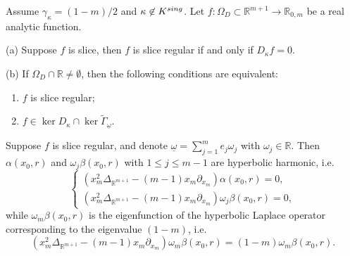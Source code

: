 \documentclass[10pt,a4paper]{amsart}
\begin{document}
\begin{theorem}  \label{sm1}  Assume $\gamma_{\kappa}=(1-m)/2$ and $\kappa \not\in K^{{\rm sing}}$. Let $f: \Omega_{D}\subset \mathbb{R}^{m+1}\to\mathbb{R}_{0, m}$ be a real analytic function.

{\rm (a)}  Suppose $f$ is slice, then $f$ is slice regular if and only if  $D_\kappa f=0$.

{\rm (b)} If  $\Omega_D\cap\mathbb{R}\neq\emptyset$,
then the following conditions are equivalent:
    \begin{enumerate}
        \item  $f$ is slice regular;
        \item  $f\in\ker D_\kappa \cap \ker \widetilde{\Gamma}_{\underline\omega}$.
    \end{enumerate}
\end{theorem}

\begin{theorem}
 \label{sld1} Suppose $f$ is  slice regular, and denote $\underline{\omega}=\sum_{j=1}^{m}e_{j}\omega_{j}$ with $\omega_{j}\in \mathbb{R}$. Then  $\alpha(x_{0}, r) $ and   $\omega_{j} \beta(x_{0}, r)$ with $1\le j\le m-1$ are hyperbolic harmonic, i.e.
 \begin{equation} \label{a1}
    \left\{
  \begin{array}{ll}
    \displaystyle\left(x_{m}^{2}\Delta_{\mathbb{R}^{m+1}} -(m-1)x_{m} \partial_{x_{m}}\right)\alpha(x_{0}, r)=0, \\

  \displaystyle \left(x_{m}^{2}\Delta_{\mathbb{R}^{m+1}} -(m-1)x_{m} \partial_{x_{m}}\right) \omega_{j} \beta(x_{0}, r)=0,
  \end{array}
\right.
\end{equation}
while  $ \omega_{m}\beta(x_{0}, r)$ is the eigenfunction of the hyperbolic Laplace operator  corresponding to the eigenvalue $(1-m)$, i.e.
\begin{equation*}
 \left(x_{m}^{2}\Delta_{\mathbb{R}^{m+1}} -(m-1)x_{m} \partial_{x_{m}}\right) \omega_{m}\beta(x_{0}, r)=(1-m) \omega_{m}\beta(x_{0}, r).
\end{equation*}
\end{theorem}
\end{document}

